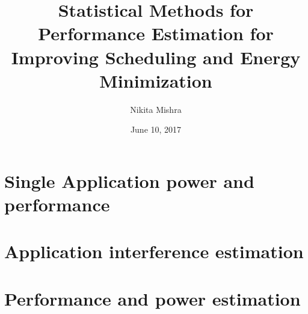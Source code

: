\documentclass{ucetd}
\title{Statistical Methods for Performance Estimation for Improving Scheduling and Energy Minimization}
\author{Nikita Mishra}
\date{June 10, 2017}
\begin{document}
\maketitle

\makecopyright
\makededication
\makeepigraph
\tableofcontents
\listoffigures
\listoftables
\graphicspath{{figures/}} %

\acknowledgments

\abstract

\mainmatter

\chapter{Single Application power and performance}












\chapter{Application interference estimation}
%










\chapter{Performance and power estimation}






\appendix


\makebibliography

%
%
\end{document}
